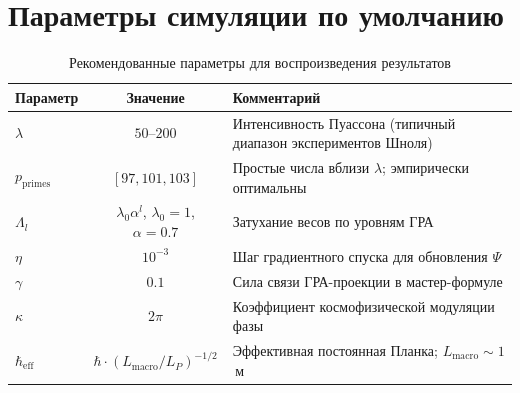\documentclass[12pt,a4paper]{article}
\theoremstyle{plain}
\theoremstyle{definition}
\theoremstyle{remark}
\newcommand{\eff}{\text{eff}}
\begin{document}
\section{Параметры симуляции по умолчанию}
\label{app:params}

\begin{table}[H]
\centering
\caption{Рекомендованные параметры для воспроизведения результатов}
\label{tab:sim-params}
\renewcommand{\arraystretch}{1.3}
\begin{tabular}{@{}lcp{7cm}@{}}
\toprule
\textbf{Параметр} & \textbf{Значение} & \textbf{Комментарий} \\
\midrule
$\lambda$ & $50$--$200$ & Интенсивность Пуассона (типичный диапазон экспериментов Шноля) \\
\addlinespace
$p_{\text{primes}}$ & $[97, 101, 103]$ & Простые числа вблизи $\lambda$; эмпирически оптимальны \\
\addlinespace
$\Lambda_l$ & $\lambda_0 \alpha^l$, $\lambda_0=1$, $\alpha=0.7$ & Затухание весов по уровням ГРА \\
\addlinespace
$\eta$ & $10^{-3}$ & Шаг градиентного спуска для обновления $\Psi$ \\
\addlinespace
$\gamma$ & $0.1$ & Сила связи ГРА-проекции в мастер-формуле \\
\addlinespace
$\kappa$ & $2\pi$ & Коэффициент космофизической модуляции фазы \\
\addlinespace
$\hbar_{\eff}$ & $\hbar \cdot (L_{\text{macro}}/L_P)^{-1/2}$ & Эффективная постоянная Планка; $L_{\text{macro}} \sim 1$\,м \\
\bottomrule
\end{tabular}
\end{table}
\end{document}
